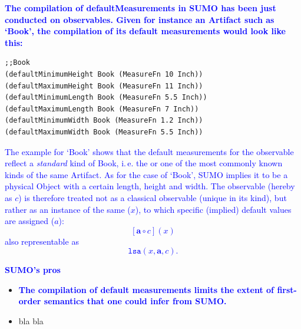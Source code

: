 \documentclass[11pt]{article}
\newcommand{\done}{\item[\checkmark]}
\begin{document}
\textbf{\textcolor{blue}{The compilation of defaultMeasurements in SUMO has been just conducted on observables. Given for instance an Artifact such as `Book', the compilation of its default measurements would look like this:}}

\begin{verbatim}
;;Book
(defaultMinimumHeight Book (MeasureFn 10 Inch))
(defaultMaximumHeight Book (MeasureFn 11 Inch))
(defaultMinimumLength Book (MeasureFn 5.5 Inch))
(defaultMaximumLength Book (MeasureFn 7 Inch))
(defaultMinimumWidth Book (MeasureFn 1.2 Inch))
(defaultMaximumWidth Book (MeasureFn 5.5 Inch))
\end{verbatim}


\textcolor{blue}{The example for `Book' shows that the default measurements for the observable reflect a \textit{standard} kind of Book, i.\,e. the or one of the most commonly known kinds of the same Artifact. As for the case of `Book', SUMO implies it to be a physical Object with a certain length, height and width. The observable (hereby as $c$) is therefore treated not as a classical observable (unique in its kind), but rather as an instance of the same ($x$), to which specific (implied) default values are assigned (\textbf{$a$}): \[ [\textbf{a} \circ c](x)\]also representable as \[ \texttt{lsa}(x, \textbf{a}, c).\]}


\textbf{\textcolor{blue}{SUMO's pros}}
\begin{itemize}[label=$\bar$]
\done \textbf{\textcolor{blue}{The compilation of default measurements limits the extent of first-order semantics that one could infer from SUMO.}}
\done bla bla 
\end{itemize}
\end{document}
